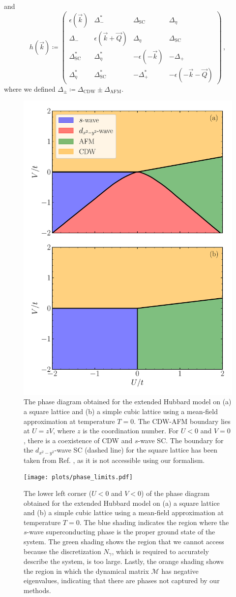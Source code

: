 \documentclass[
    reprint, 
    aps,
    preprintnumbers,
    twocolumn,
    prb,
    superscriptaddress
]{revtex4-2}
\newcommand{\vk}{\vec{k}}
\newcommand{\vQ}{\vec{Q}}
\newcommand{\mM}{\mathcal{M}}
\begin{document}
and 
\begin{equation}
    h(\vk) \coloneqq  \begin{pmatrix}
        \epsilon (\vk) & \Delta_-^* & \Delta_\text{SC} & \Delta_\eta \\
        \Delta_- & \epsilon (\vk + \vQ) & \Delta_\eta & \Delta_\text{SC} \\
        \Delta_\text{SC}^* & \Delta_\eta^* & - \epsilon (-\vk) & - \Delta_+ \\
        \Delta_\eta^* & \Delta_\text{SC}^* & - \Delta_+^* & - \epsilon (-\vk - \vQ)
        \end{pmatrix}\,,
\end{equation}
where we defined $\Delta_\pm \coloneqq \Delta_\text{CDW} \pm \Delta_\text{AFM}$.

\begin{figure}
    \centering
    \includegraphics[width=.48\textwidth]{plots/phase_diagram.pdf}
    \caption{The phase diagram obtained for the extended Hubbard model on 
    (a) a square lattice and (b) a simple cubic lattice using a mean-field approximation at temperature $T=0$.
    The CDW-AFM boundary lies at $U = zV$, where $z$ is the coordination number. 
    For $U<0$ and $V=0$, there is a coexistence of CDW and $s$-wave SC.
    The boundary for the $d_{x^2 - y^2}$-wave SC (dashed line) for the square lattice has been taken from Ref. \cite{Micnas88b}, 
    as it is not accessible using our formalism.}
    \label{fig:phase_diagram}
\end{figure}

\begin{figure}
    \centering
    \texttt{[image: plots/phase\_limits.pdf]}
    \caption{The lower left corner ($U<0$ and $V<0$) of the phase diagram obtained for the extended Hubbard model on 
    (a) a square lattice and (b) a simple cubic lattice using a mean-field approximation at temperature $T=0$.
    The blue shading indicates the region where the $s$-wave superconducting phase is the proper ground state of the system.
    The green shading shows the region that we cannot access because the discretization $N_\gamma$, which is required to accurately describe the system, is too large.
    Lastly, the orange shading shows the region in which the dynamical matrix $\mM$ has negative eigenvalues, indicating that there are phases not captured by our methods.}
    \label{fig:phase_limits}
\end{figure}
\end{document}
